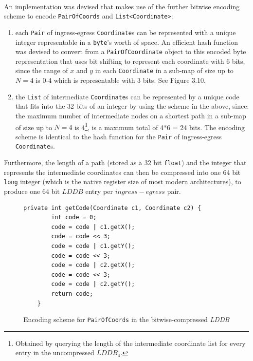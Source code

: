 \documentclass[12pt,notitlepage]{report}
\begin{document}
\\
\noindent
An implementation was devised that makes use of the further bitwise encoding scheme to encode {\tt PairOfCoords} and {\tt List<Coordinate>}:
\begin{enumerate}
\item each {\tt Pair} of ingress-egress {\tt Coordinate}s can be represented with a unique integer representable in a {\tt byte}'s worth of space. An efficient hash function was devised to convert from a {\tt PairOfCoordinate} object to this encoded byte representation that uses bit shifting to represent each coordinate with 6 bits, since the range of $x$ and $y$ in each {\tt Coordinate} in a sub-map of size up to {$N=4$} is 0-4 which is representable with 3 bits. See Figure 3.10.
\item the {\tt List} of intermediate {\tt Coordinate}s can be represented by a unique code that fits into the 32 bits of an integer by using the scheme in the above, since: the maximum number of intermediate nodes on a shortest path in a sub-map of size up to {$N=4$} is 4\footnote{Obtained by querying the length of the intermediate coordinate list for every entry in the uncompressed $LDDB_{4}$.}, is a maximum total of 4*6 = 24 bits. The encoding scheme is identical to the hash function for the {\tt Pair} of ingress-egress {\tt Coordinate}s.
\end{enumerate}

\noindent
Furthermore, the length of a path (stored as a 32 bit {\tt float}) and the integer that represents the intermediate coordinates can then be compressed into one 64 bit {\tt long} integer (which is the native register size of most modern architectures), to produce one 64 bit $LDDB$ entry per $ingress-egress$ pair.\\

\begin{figure}
\begin{lstlisting}
private int getCode(Coordinate c1, Coordinate c2) {
		int code = 0;
		code = code | c1.getX();
		code = code << 3;
		code = code | c1.getY();
		code = code << 3;
		code = code | c2.getX();
		code = code << 3;
		code = code | c2.getY();
		return code;	
	}
\end{lstlisting}
\caption{Encoding scheme for {\tt PairOfCoords} in the bitwise-compressed {\em LDDB}}
\end{figure}
\end{document}
